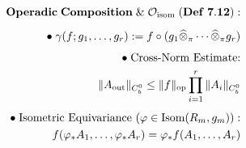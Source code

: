 \documentclass[preview]{standalone}
\begin{document}
\begin{align*}
\special{dvisvgm:raw <g id='unique000'>}\mathbf{Operadic\;Composition\;\&\;\mathcal{O}_{\text{isom}}\;(Def\;7.12):}\\[5pt]\bullet\;\gamma(f; g_1,\dots,g_r) := f\circ(g_1\widehat{\otimes}_\pi\cdots\widehat{\otimes}_\pi g_r)\\[4pt]\bullet\;\text{Cross-Norm Estimate:}\\\;\;\|A_{\text{out}}\|_{C_b^0} \le \|f\|_{\text{op}}\prod_{i=1}^r \|A_i\|_{C_b^0}\\[4pt]\bullet\;\text{Isometric Equivariance }(\varphi\in\operatorname{Isom}(R_m,g_m)):\\\;\;f(\varphi_* A_1,\dots,\varphi_* A_r) = \varphi_* f(A_1,\dots,A_r)\special{dvisvgm:raw </g>}
\end{align*}
\end{document}
